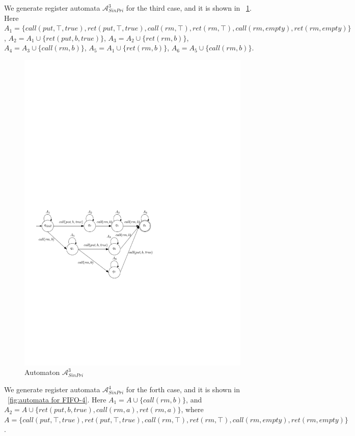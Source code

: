 We generate register automata $\mathcal{A}_{\textit{SinPri}}^3$ for the third case, and it is shown in \figurename~\ref{fig:automata for FIFO-3}. Here $A_1 = \{ \textit{call}(\textit{put},\top,\textit{true}),\textit{ret}(\textit{put},\top,\textit{true}), \textit{call}(\textit{rm},\top),\textit{ret}(\textit{rm},\top),\textit{call}(\textit{rm},\textit{empty}),\textit{ret}(\textit{rm},\textit{empty}) \}$, $A_2 = A_1 \cup \{ \textit{ret}(\textit{put},b,\textit{true}) \}$, $A_3 = A_2 \cup \{ \textit{ret}(\textit{rm},b) \}$, $A_4 = A_3 \cup \{ \textit{call}(\textit{rm},b) \}$, $A_5 = A_1 \cup \{ \textit{ret}(\textit{rm},b) \}$, $A_6 = A_5 \cup \{ \textit{call}(\textit{rm},b) \}$.

\begin{figure}[htbp]
  \centering
  \includegraphics[width=0.7 \textwidth]{figures/PIC_AUTO_FIFO_3.pdf}
  \caption{Automaton $\mathcal{A}_{\textit{SinPri}}^3$}
  \label{fig:automata for FIFO-3}
\end{figure}

We generate register automata $\mathcal{A}_{\textit{SinPri}}^4$ for the forth case, and it is shown in \figurename~\ref{fig:automata for FIFO-4}. Here $A_1 = A \cup \{ \textit{call}(\textit{rm},b) \}$, and $A_2 = A \cup \{ \textit{ret}(\textit{put},b,\textit{true}), \textit{call}(\textit{rm},a), \textit{ret}(\textit{rm},a) \}$, where $A = \{ \textit{call}(\textit{put},\top,\textit{true}),\textit{ret}(\textit{put},\top,\textit{true}), \textit{call}(\textit{rm},\top),\textit{ret}(\textit{rm},\top),\textit{call}(\textit{rm},\textit{empty}),\textit{ret}(\textit{rm},\textit{empty}) \}$.


